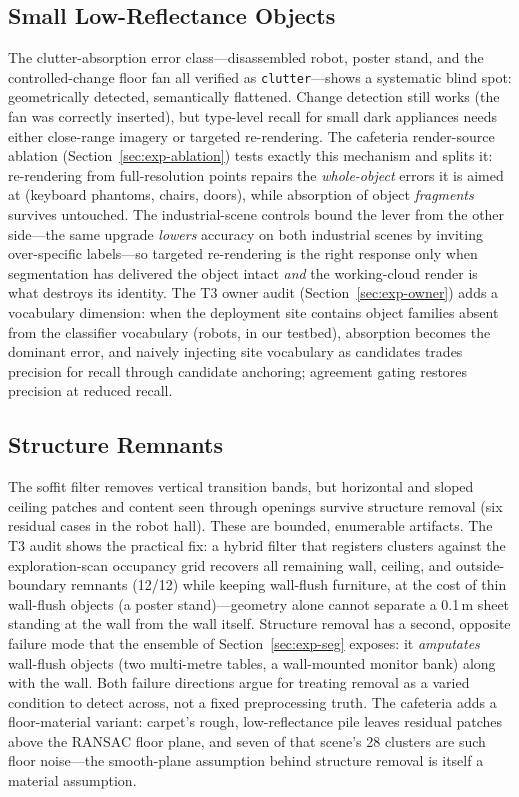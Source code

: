 \documentclass[electronics,article,accept,pdftex,moreauthors]{Definitions/mdpi}
\begin{document}
\subsection{Small Low-Reflectance Objects}
The clutter-absorption error class---disassembled robot, poster stand, and
the controlled-change floor fan all verified as
\texttt{clutter}---shows a systematic blind spot: geometrically detected,
semantically flattened. Change detection still works (the fan was
correctly inserted), but type-level recall for small dark appliances needs
either close-range imagery or targeted re-rendering. The cafeteria
render-source ablation (Section~\ref{sec:exp-ablation}) tests exactly this
mechanism and splits it: re-rendering from full-resolution points repairs
the \emph{whole-object} errors it is aimed at (keyboard phantoms, chairs,
doors), while absorption of object \emph{fragments} survives untouched.
The industrial-scene controls bound the lever from the other side---the
same upgrade \emph{lowers} accuracy on both industrial scenes by
inviting over-specific labels---so targeted re-rendering is the right
response only when segmentation has delivered the object intact
\emph{and} the working-cloud render is what destroys its identity. The T3 owner audit
(Section~\ref{sec:exp-owner}) adds a vocabulary dimension: when the
deployment site contains object families absent from the classifier
vocabulary (robots, in our testbed), absorption becomes the dominant
error, and naively injecting site vocabulary as candidates trades
precision for recall through candidate anchoring; agreement gating
restores precision at reduced recall.

\subsection{Structure Remnants}
The soffit filter removes vertical transition bands, but horizontal and
sloped ceiling patches and content seen through openings survive structure
removal (six residual cases in the robot hall). These are bounded,
enumerable artifacts. The T3 audit shows the practical fix: a hybrid
filter that registers clusters against the exploration-scan occupancy
grid recovers all remaining wall, ceiling, and outside-boundary remnants
(12/12) while keeping wall-flush furniture, at the cost of thin
wall-flush objects (a poster stand)---geometry alone cannot separate a
0.1\,m sheet standing at the wall from the wall itself. Structure
removal has a second, opposite failure mode that the ensemble of
Section~\ref{sec:exp-seg} exposes: it \emph{amputates} wall-flush objects
(two multi-metre tables, a wall-mounted monitor bank) along with the
wall. Both failure directions argue for treating removal as a varied
condition to detect across, not a fixed preprocessing truth. The
cafeteria adds a floor-material variant: carpet's rough, low-reflectance
pile leaves residual patches above the RANSAC floor plane, and seven of
that scene's 28 clusters are such floor noise---the smooth-plane
assumption behind structure removal is itself a material assumption.
\end{document}
